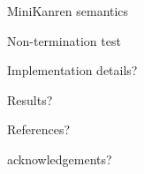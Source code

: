 \documentclass[final]{beamer}
\newlength{\onecolwid}
\begin{document}
\begin{frame}[fragile]
\begin{columns}[t]
\begin{column}{\onecolwid}
\begin{block}{MiniKanren semantics}
\end{block}

\begin{block}{Non-termination test}

\end{block}

\begin{block}{Implementation details?}

\end{block}

\begin{block}{Results?}

\end{block}

\begin{block}{References?}

\end{block}

\begin{block}{acknowledgements?}

\end{block}

\begin{comment}

\begin{block}{Non-termination test}

For description and proof purposes we describe specific big-step operational semantics for miniKanren, which cover only the case of evaluation with finitely many answers.

\[ \Delta \vdash \sigma \xRightarrow{g} S \]

Which means that evaluation of specification $g$ with initial substitution $\sigma$ and functions definitions $\Delta$ terminates with set of answers $S$.

We chose following observation as non-termination test:

\begin{alertblock}{Non-termination criterion}

If during the derivation of some branch we arrived at the 
following configuration

$$
\begin{array}{c}
  \Delta\vdash\sigma_2\xRightarrow{f(x_1,\dots,x_n)}\\
  \ldots\\
  \Delta\vdash\sigma_1\xRightarrow{f(y_1,\dots,y_n)} 
\end{array}
$$

and there is some substitution $\tau$, such that $y_i\sigma_1=(x_i\sigma_2)\tau$, then there is no $S$, such that $\Delta\vdash\sigma_2\xRightarrow{f(x_1,\dots,x_n)} S$.


\end{comment}
\end{column}
\end{columns}
\end{frame}
\end{document}
